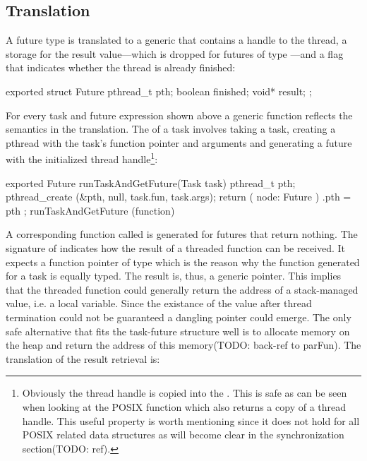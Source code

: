 \subsection{Translation}
A future type  is translated to a generic  that contains a handle to the thread, a storage for the result value---which is dropped for futures of type ---and a flag that indicates whether the thread is already finished:
\begin{ccode}
exported struct Future { 
  pthread_t pth; 
  boolean finished; 
  void* result; 
};
\end{ccode}

For every task and future expression shown above a generic function reflects the semantics in the translation. The  of a task involves taking a task, creating a pthread with the task's function pointer and arguments and generating a future with the initialized thread handle\footnote{Obviously the thread handle is copied into the . This is safe as can be seen when looking at the POSIX function  which also returns a copy of a thread handle. This useful property is worth mentioning since it does not hold for all POSIX related data structures as will become clear in the synchronization section(TODO: ref).}:
\begin{ccode}
exported Future runTaskAndGetFuture(Task task) { 
  pthread_t pth; 
  pthread_create (&pth, null, task.fun, task.args);
  return ( node: Future ){ .pth = pth }; 
} runTaskAndGetFuture (function)
\end{ccode}
A corresponding function called  is generated for futures that return nothing. The signature of  indicates how the result of a threaded function can be received. It expects a function pointer of type  which is the reason why the function generated for a task is equally typed. The result is, thus, a generic  pointer. This implies that the threaded function could generally return the address of a stack-managed value, i.e. a local variable. Since the existance of the value after thread termination could not be guaranteed a dangling pointer\cite{UnderstandingAndUsingCPointers} could emerge. The only safe alternative that fits the task-future structure well is to allocate memory on the heap and return the address of this memory(TODO: back-ref to parFun). The translation of the result retrieval is:

